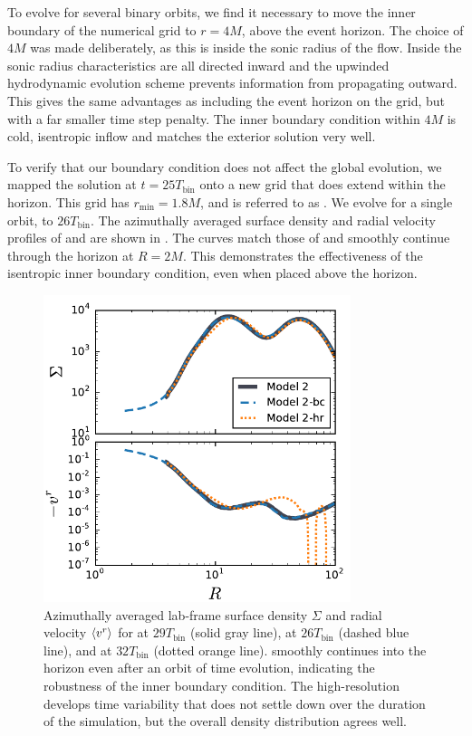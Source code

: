 To evolve for several binary orbits, we find it necessary to move the inner boundary of the numerical grid to $r=4M$, above the event horizon.  The choice of $4M$ was made deliberately, as this is inside the sonic radius of the flow. Inside the sonic radius characteristics are all directed inward and the upwinded hydrodynamic evolution scheme prevents information from propagating outward.  This gives the same advantages as including the event horizon on the grid, but with a far smaller time step penalty.  The inner boundary condition within $4M$ is cold, isentropic inflow and matches the exterior solution very well.

To verify that our boundary condition does not affect the global evolution, we mapped the  solution at $t=25 T_\text{bin}$ onto a new grid that does extend within the horizon.  This grid has $r_\text{min} = 1.8M$, and is referred to as .  We evolve  for a single orbit, to $26T_\text{bin}$.  The azimuthally averaged surface density and radial velocity profiles of  and  are shown in .  The  curves match those of  and smoothly continue through the horizon at $R=2M$.  This demonstrates the effectiveness of the isentropic inner boundary condition, even when placed above the horizon.

\begin{figure}
	\begin{center}
	\includegraphics[width=0.8\textwidth]{figures/minidisk/q011_bc_hr_comp.pdf}
	\end{center}
	\caption{ Azimuthally averaged lab-frame surface density $\Sigma$ and radial velocity $\left \langle v^r \right \rangle$ for  at $29T_\text{bin}$ (solid gray line),  at $26T_\text{bin}$ (dashed blue line), and   at $32T_\text{bin}$ (dotted orange line).  smoothly continues  into the horizon even after an orbit of time evolution, indicating the robustness of the inner boundary condition.  The high-resolution  develops time variability that does not settle down over the duration of the simulation, but the overall density distribution agrees well.}
\end{figure}

